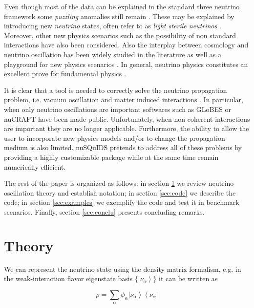 \documentclass[3p,12pt,authoryear]{elsarticle}
\newcommand{\bra}[1]{\ensuremath{\left\langle#1\right|}}
\newcommand{\ket}[1]{\ensuremath{\left|#1\right\rangle}}
\newcommand{\ttf}{\ttfamily}
\begin{document}
Even though most of the data can be explained in the standard three neutrino framework some {\it puzzling} anomalies still remain \citep{LSND,Mention:2011rr,MiniBoone:2012dn}. These may be explained by introducing new {\it neutrino} states, often refer to as {\it light sterile neutrinos} \citep{kopp2013sterile,Conrad:2013oq,Abazajian:2012rf}. Moreover, other new physics scenarios such as the possibility of non standard interactions \citep{Kopp:2014nosterile,Pospelov:2011dp} have also been considered. Also the interplay between cosmology and neutrino oscillation has been widely studied in the literature as well as a playground for new physics scenarios \citep{Archidiacono:2014oq,Dasgupta:2013la,Saviano:2014bs}. In general, neutrino physics constitutes an excellent prove for fundamental physics \citep{Hewett:2012et}.

It is clear that a tool is needed to correctly solve the neutrino propagation problem, i.e. vacuum oscillation and matter induced interactions \citep{Blennow:2013hi}. In particular, when only neutrino oscillations are important  softwares such as {\ttf GLoBES} \citep{Huber:2007ji} or {\ttf nuCRAFT} \citep{Wallraff:2014vl} have been made public. Unfortunately, when non coherent interactions are important they are no longer applicable. Furthermore, the ability to allow the user to incorporate new physics models and/or to change the propagation medium is also limited. {\ttf nuSQuIDS} pretends to address all of these problems by providing a highly customizable package while at the same time remain numerically efficient.

The rest of the paper is organized as follows: in section \ref{sec:theory} we review neutrino oscillation theory and establish notation; in section \ref{sec:code} we describe the code; in section \ref{sec:examples} we exemplify the code and test it in benchmark scenarios. Finally, section \ref{sec:conclu} presents concluding remarks.

\section{Theory}
\label{sec:theory} 
\let\thefootnote\relax{} 

We can represent the neutrino state using the density matrix formalism, e.g. in the weak-interaction flavor eigenstate basis $\{\ket{\nu_\alpha}\}$  it can be written as

\begin{equation}
\rho = \sum_\alpha \phi_\alpha \ket{\nu_\alpha}\bra{\nu_\alpha} 
\label{eq:state}
\end{equation}
\end{document}
